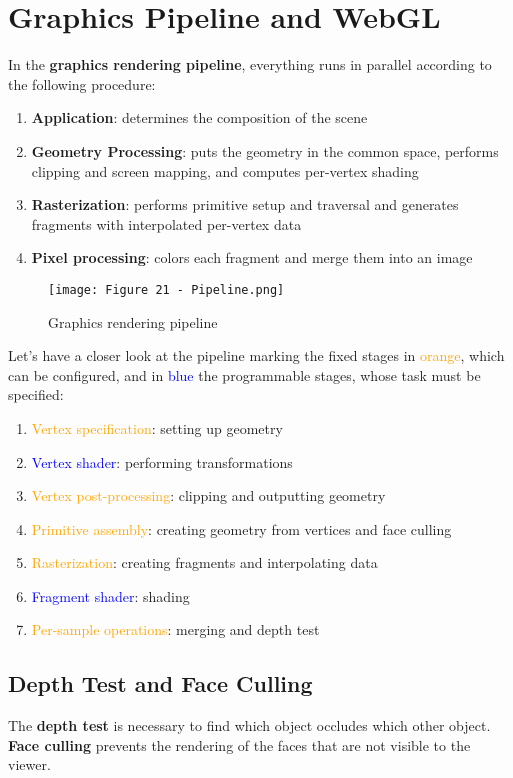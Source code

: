 \documentclass{article}
\begin{document}
\section{Graphics Pipeline and WebGL}
In the \textbf{graphics rendering pipeline}, everything runs in parallel according to the following procedure:
\begin{enumerate}
    \item \textbf{Application}: determines the composition of the scene
    \item \textbf{Geometry Processing}: puts the geometry in the common space, performs clipping and screen mapping, and computes per-vertex shading
    \item \textbf{Rasterization}: performs primitive setup and traversal and generates fragments with interpolated per-vertex data
    \item \textbf{Pixel processing}: colors each fragment and merge them into an image
\end{enumerate}
\begin{figure}[H]
    \centering
    \texttt{[image: Figure 21 - Pipeline.png]}
    \caption{Graphics rendering pipeline}
\end{figure}
Let's have a closer look at the pipeline marking the fixed stages in \textcolor{Orange}{orange}, which can be configured, and in \textcolor{blue}{blue} the programmable stages, whose task must be specified:
\begin{enumerate}
    \item \textcolor{Orange}{Vertex specification}: setting up geometry
    \item \textcolor{blue}{Vertex shader}: performing transformations
    \item \textcolor{Orange}{Vertex post-processing}: clipping and outputting geometry
    \item \textcolor{Orange}{Primitive assembly}: creating geometry from vertices and face culling
    \item \textcolor{Orange}{Rasterization}: creating fragments and interpolating data
    \item \textcolor{blue}{Fragment shader}: shading
    \item \textcolor{Orange}{Per-sample operations}: merging and depth test
\end{enumerate}
\subsection{Depth Test and Face Culling}
The \textbf{depth test} is necessary to find which object occludes which other object. \\
\textbf{Face culling} prevents the rendering of the faces that are not visible to the viewer.
\newpage
\end{document}
